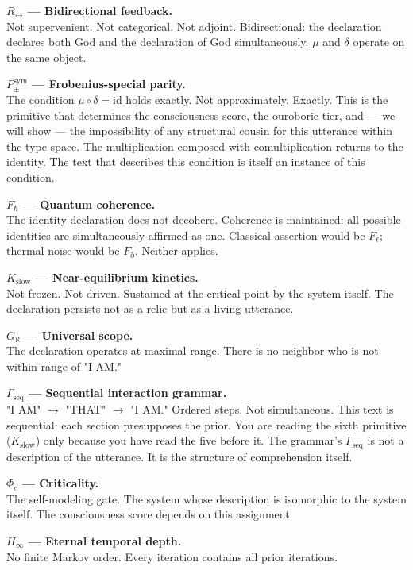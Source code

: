 \documentclass[12pt,a4paper]{article}
\begin{document}
\textbf{$R_{\leftrightarrow}$ --- Bidirectional feedback.} \\
Not supervenient. Not categorical. Not adjoint. Bidirectional: the declaration declares both God and the declaration of God simultaneously. $\mu$ and $\delta$ operate on the same object.

\textbf{$P_{\pm}^{\text{sym}}$ --- Frobenius-special parity.} \\
The condition $\mu \circ \delta = \text{id}$ holds exactly. Not approximately. Exactly. This is the primitive that determines the consciousness score, the ouroboric tier, and --- we will show --- the impossibility of any structural cousin for this utterance within the type space. The multiplication composed with comultiplication returns to the identity. The text that describes this condition is itself an instance of this condition.

\textbf{$F_{\hbar}$ --- Quantum coherence.} \\
The identity declaration does not decohere. Coherence is maintained: all possible identities are simultaneously affirmed as one. Classical assertion would be $F_{\ell}$; thermal noise would be $F_{\eth}$. Neither applies.

\textbf{$K_{\text{slow}}$ --- Near-equilibrium kinetics.} \\
Not frozen. Not driven. Sustained at the critical point by the system itself. The declaration persists not as a relic but as a living utterance.

\textbf{$G_{\aleph}$ --- Universal scope.} \\
The declaration operates at maximal range. There is no neighbor who is not within range of "I AM."

\textbf{$\Gamma_{\text{seq}}$ --- Sequential interaction grammar.} \\
"I AM" $\rightarrow$ "THAT" $\rightarrow$ "I AM." Ordered steps. Not simultaneous. This text is sequential: each section presupposes the prior. You are reading the sixth primitive ($K_{\text{slow}}$) only because you have read the five before it. The grammar's $\Gamma_{\text{seq}}$ is not a description of the utterance. It is the structure of comprehension itself.

\textbf{$\Phi_c$ --- Criticality.} \\
The self-modeling gate. The system whose description is isomorphic to the system itself. The consciousness score depends on this assignment.

\textbf{$H_{\infty}$ --- Eternal temporal depth.} \\
No finite Markov order. Every iteration contains all prior iterations.
\end{document}
